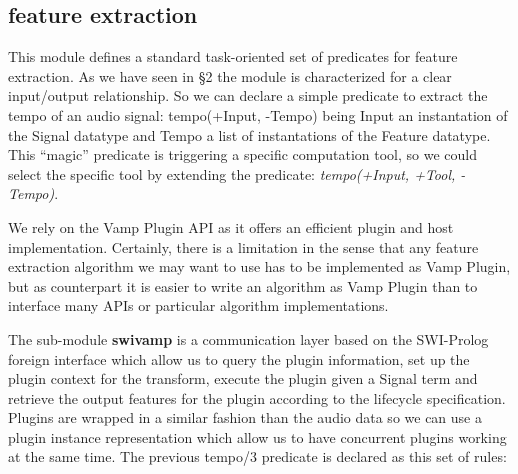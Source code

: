 \documentclass[runningheads]{llncs}
\begin{document}
\subsection{feature extraction}\label{subsec:swivamp}

This module defines a standard task-oriented set of predicates for feature extraction. As we have seen in \S 2 the module is characterized for a clear input/output relationship. So we can declare a simple predicate to extract the tempo of an audio signal: tempo(+Input, -Tempo) being Input an instantation of the Signal datatype and Tempo a list of instantations of the Feature datatype. This ``magic'' predicate is triggering a specific computation tool, so we could select the specific tool by extending the predicate: \textit{tempo(+Input, +Tool, -Tempo)}.

We rely on the Vamp Plugin API as it offers an efficient plugin and host implementation. Certainly, there is a limitation in the sense that any feature extraction algorithm we may want to use has to be implemented as Vamp Plugin, but as counterpart it is easier to write an algorithm as Vamp Plugin than to interface many APIs or particular algorithm implementations.

The sub-module \textbf{swivamp} is a communication layer based on the SWI-Prolog foreign interface which allow us to query the plugin information, set up the plugin context for the transform, execute the plugin given a Signal term and retrieve the output features for the plugin according to the lifecycle specification. Plugins are wrapped in a similar fashion than the audio data so we can use a plugin instance representation which allow us to have concurrent plugins working at the same time. The previous tempo/3 predicate is declared as this set of rules:

\medskip

\noindent
\end{document}
